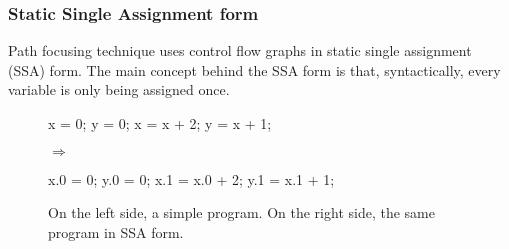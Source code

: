 \documentclass[a4paper,english,titlepage,11pt]{report}
\begin{document}
%
%
%
%
%
%
	
	\subsubsection{Static Single Assignment form}

	Path focusing technique uses control flow graphs in static single assignment
	(SSA) form. The main concept behind the SSA form is that, syntactically,
	every variable is	
	only being assigned once. 


\begin{figure}[!h]
\centering
\begin{minipage}[c]{.39\linewidth}
\begin{C}
x = 0;
y = 0;
x = x + 2;
y = x + 1;
\end{C}
\end{minipage} 
$\Longrightarrow$ \hfill
\begin{minipage}[c]{.49\linewidth}
\begin{C}
x.0 = 0;
y.0 = 0;
x.1 = x.0 + 2;
y.1 = x.1 + 1;
\end{C}
\end{minipage}
\caption{On the left side, a simple program. On the right side, the same
program in SSA form.}
\end{figure}
\end{document}
